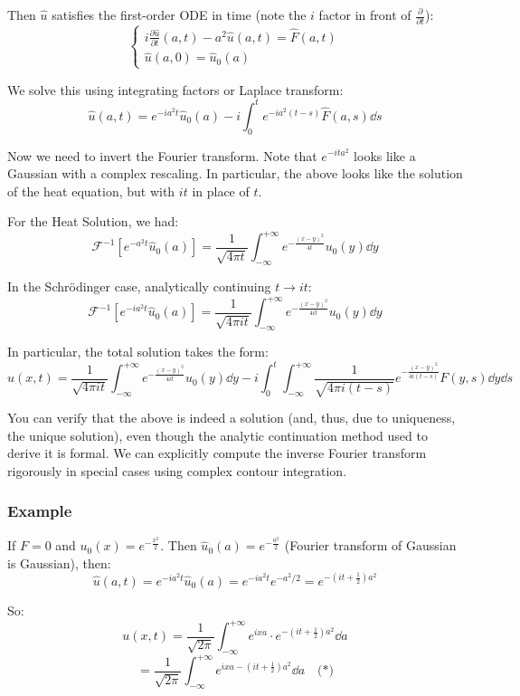 Then $\hat{u}$ satisfies the first-order ODE in time (note the $i$ factor in front of $\frac{\partial}{\partial t}$):
$$ \begin{cases}
    i\frac{\partial \hat{u}}{\partial t}(a,t) - a^2 \hat{u}(a,t) = \hat{F}(a,t) \\
    \hat{u}(a,0) = \hat{u}_0(a)
\end{cases} $$

We solve this using integrating factors or Laplace transform:
$$ \hat{u}(a,t) = e^{-ia^2t}\hat{u}_0(a) - i\int_0^t e^{-ia^2(t-s)}\hat{F}(a,s) \dd s $$

Now we need to invert the Fourier transform. Note that $e^{-ita^2}$ looks like a Gaussian with a complex rescaling. In particular, the above looks like the solution of the heat equation, but with $it$ in place of $t$.

For the Heat Solution, we had:
$$ \mathcal{F}^{-1}[e^{-a^2t} \hat{u}_0(a)] = \frac{1}{\sqrt{4\pi t}} \int_{-\infty}^{+\infty} e^{-\frac{(x-y)^2}{4t}} u_0(y) \dd y $$

In the Schrödinger case, analytically continuing $t \to it$:
$$ \mathcal{F}^{-1}[e^{-ia^2t} \hat{u}_0(a)] = \frac{1}{\sqrt{4\pi it}} \int_{-\infty}^{+\infty} e^{-\frac{(x-y)^2}{4it}} u_0(y) \dd y $$

In particular, the total solution takes the form:
\begin{equation}
    u(x,t) = \frac{1}{\sqrt{4\pi it}} \int_{-\infty}^{+\infty} e^{-\frac{(x-y)^2}{4it}} u_0(y) \dd y - i \int_0^t \int_{-\infty}^{+\infty} \frac{1}{\sqrt{4\pi i (t-s)}} e^{-\frac{(x-y)^2}{4i(t-s)}} F(y,s) \dd y \dd s
\end{equation}

You can verify that the above is indeed a solution (and, thus, due to uniqueness, the unique solution), even though the analytic continuation method used to derive it is formal. We can explicitly compute the inverse Fourier transform rigorously in special cases using complex contour integration.

\subsubsection{Example}
If $F=0$ and $u_0(x) = e^{-\frac{x^2}{2}}$.
Then $\hat{u}_0(a) = e^{-\frac{a^2}{2}}$ (Fourier transform of Gaussian is Gaussian), then:
$$ \hat{u}(a,t) = e^{-ia^2t}\hat{u}_0(a) = e^{-ia^2t} e^{-a^2/2} = e^{-(it+\frac{1}{2})a^2} $$

So:
$$ u(x,t) = \frac{1}{\sqrt{2\pi}} \int_{-\infty}^{+\infty} e^{ixa} \cdot e^{-(it+\frac{1}{2})a^2} \dd a $$
$$ = \frac{1}{\sqrt{2\pi}} \int_{-\infty}^{+\infty} e^{ixa - (it+\frac{1}{2})a^2} \dd a \quad \text{(*)} $$

